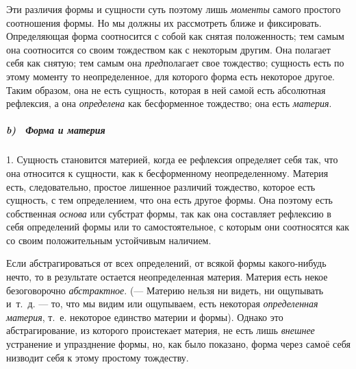 Эти различия формы и сущности суть поэтому лишь
{\em моменты} самого простого соотношения формы. Но мы
должны их рассмотреть ближе и фиксировать. Определяющая форма соотносится с
собой как снятая положенность; тем самым она соотносится со своим
тождеством как с некоторым другим. Она полагает себя как снятую; тем самым
она {\em пред}полагает свое тождество; сущность есть по
этому моменту то неопределенное, для которого форма есть некоторое другое.
Таким образом, она не есть сущность, которая в ней самой есть абсолютная
рефлексия, а она {\em определена} как бесформенное
тождество; она есть {\em материя}.

\subparagraph[b) \ Форма и материя]{b) \ Форма и материя}
1. Сущность становится материей, когда ее
рефлексия определяет себя так, что она относится к сущности, как к
бесформенному неопределенному. Материя есть, следовательно, простое
лишенное различий тождество, которое есть сущность, с тем определением, что
она есть другое формы. Она поэтому есть собственная
{\em основа} или субстрат формы, так как она составляет
рефлексию в себя определений формы или то самостоятельное, с которым они
соотносятся как со своим положительным устойчивым наличием.

Если абстрагироваться от всех определений, от всякой формы какого-нибудь
нечто, то в результате остается неопределенная материя. Материя есть некое
безоговорочно {\em абстрактное}. (— Материю нельзя ни
видеть, ни ощупывать и~т.~д. — то, что мы видим или ощупываем, есть
некоторая {\em определенная материя}, т.~е. некоторое
единство материи и формы). Однако это абстрагирование, из которого
проистекает материя, не есть лишь {\em внешнее}
устранение и упразднение формы, но, как было показано, форма через самоё
себя низводит себя к этому простому тождеству.

